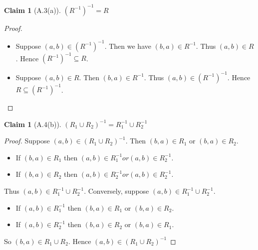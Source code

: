 \documentclass[12pt,aspectratio=169]{beamer}
\theoremstyle{claim}
\newtheorem{claim}[theorem]{Claim}%
\begin{document}
\begin{frame}
    \begin{claim}[A.3(a)]
      $(R^{-1})^{-1} = R$
    \end{claim}
    \begin{proof}
      \begin{itemize}
            \pause
            \item Suppose $(a,b) \in (R^{-1})^{-1}$.\pause
                  Then we have $(b,a) \in R^{-1}$.\pause
                  Thus $(a,b) \in R$. Hence $(R^{-1})^{-1} \subseteq R$.
            \pause
            \item Suppose $(a,b) \in R$.\pause
                  Then $(b,a) \in R^{-1}$. Thus $(a,b) \in (R^{-1})^{-1}$.\pause
                  Hence  $R \subseteq (R^{-1})^{-1}$.
      \end{itemize}
    \end{proof}
\end{frame}

\begin{frame}
    \begin{claim}[A.4(b)]
        $(R_1 \cup R_2)^{-1} = R_1^{-1} \cup R_2^{-1}$
    \end{claim}
    \begin{proof}
        \pause
        Suppose $(a,b) \in (R_1 \cup R_2)^{-1}$.\pause
        Then $(b,a) \in R_1$ or $(b,a) \in R_2$.\pause
        \begin{itemize}
          \item If $(b,a) \in R_1$ then $(a,b) \in R_1^{-1} or (a,b) \in R_2^{-1}$. \pause
          \item If $(b,a) \in R_2$ then $(a,b) \in R_2^{-1} or (a,b) \in R_2^{-1}$. \pause
        \end{itemize}
        Thus $(a,b) \in R_1^{-1} \cup R_2^{-1}$.\pause
        Conversely, suppose $(a,b) \in R_1^{-1} \cup R_2^{-1}$. \pause
        \begin{itemize}
          \item If $(a,b) \in R_1^{-1}$ then $(b,a) \in R_1$ or $(b,a) \in R_2$.\pause
          \item If $(a,b) \in R_2^{-1}$ then $(b,a) \in R_2$ or $(b,a) \in R_1$.\pause
        \end{itemize}
        So $(b,a) \in R_1 \cup R_2$. Hence $(a,b) \in (R_1 \cup R_2)^{-1}$
    \end{proof}
\end{frame}
\end{document}
